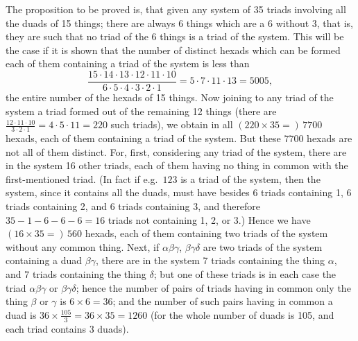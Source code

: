 \documentclass[11pt,a4paper]{article}
\theoremstyle{plain}
\begin{document}
The proposition to be proved is, that given any system of 35 triads involving all the duads of 15 things; there are always 6 things which are a 6 without 3, that is, they are such that no triad of the 6 things is a triad of the system. This will be the case if it is shown that the number of distinct hexads which can be formed each of them containing a triad of the system is less than
\[
\frac{15 \cdot 14 \cdot 13 \cdot 12 \cdot 11 \cdot 10}{6 \cdot 5 \cdot 4 \cdot 3 \cdot 2 \cdot 1} = 5 \cdot 7 \cdot 11 \cdot 13 = 5005,
\]
the entire number of the hexads of 15 things. Now joining to any triad of the system a triad formed out of the remaining 12 things (there are $\frac{12 \cdot 11 \cdot 10}{3 \cdot 2 \cdot 1} = 4 \cdot 5 \cdot 11 = 220$ such triads), we obtain in all $(220 \times 35 =)\, 7700$ hexads, each of them containing a triad of the system. But these 7700 hexads are not all of them distinct. For, first, considering any triad of the system, there are in the system 16 other triads, each of them having no thing in common with the first-mentioned triad. (In fact if e.g.\ $123$ is a triad of the system, then the system, since it contains all the duads, must have besides 6 triads containing 1, 6 triads containing 2, and 6 triads containing 3, and therefore $35 - 1 - 6 - 6 - 6 = 16$ triads not containing 1, 2, or 3.) Hence we have $(16 \times 35 =)\, 560$ hexads, each of them containing two triads of the system without any common thing. Next, if $\alpha\beta\gamma$, $\beta\gamma\delta$ are two triads of the system containing a duad $\beta\gamma$, there are in the system 7 triads containing the thing $\alpha$, and 7 triads containing the thing $\delta$; but one of these triads is in each case the triad $\alpha\beta\gamma$ or $\beta\gamma\delta$; hence the number of pairs of triads having in common only the thing $\beta$ or $\gamma$ is $6 \times 6 = 36$; and the number of such pairs having in common a duad is $36 \times \frac{105}{3} = 36 \times 35 = 1260$ (for the whole number of duads is 105, and each triad contains 3 duads).
\end{document}
